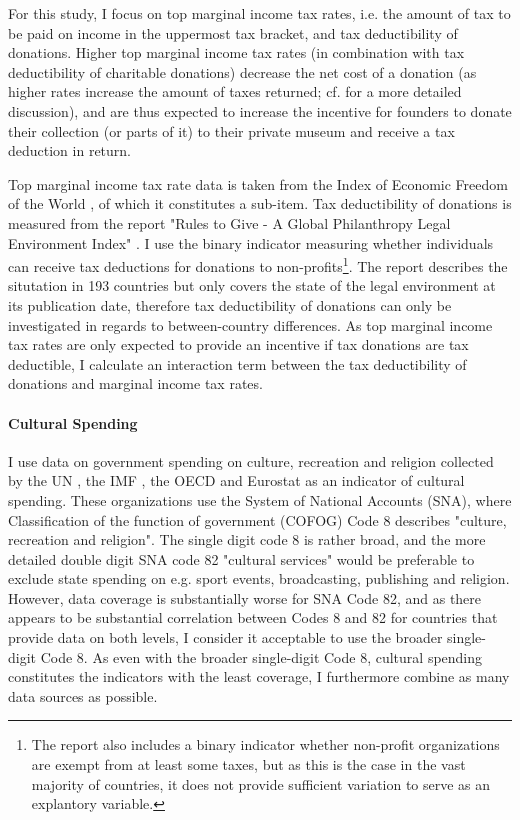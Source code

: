 \documentclass[11pt]{article}
\begin{document}
For this study, I focus on top marginal income tax rates, i.e. the amount of tax to be paid on income in the uppermost tax bracket, and tax deductibility of donations.
Higher top marginal income tax rates (in combination with tax deductibility of charitable donations) decrease the net cost of a donation (as higher rates increase the amount of taxes returned; cf. \cite{Hemels_2017_incentives} for a more detailed discussion), and are thus expected to increase the incentive for founders to donate their collection (or parts of it) to their private museum and receive a tax deduction in return. 


Top marginal income tax rate data is taken from the Index of Economic Freedom of the World \parencite{Fraser_2022_economic_freedom}, of which it constitutes a sub-item.
Tax deductibility of donations is measured from the report "Rules to Give - A Global Philanthropy Legal Environment Index" \parencite{Quick_Kruse_Pickering_2014_philanthropy}.
I use the binary indicator measuring whether individuals can receive tax deductions for donations to non-profits\footnote{The report also includes a binary indicator whether non-profit organizations are exempt from at least some taxes, but as this is the case in the vast majority of countries, it does not provide sufficient variation to serve as an explantory variable.}.
The report describes the situtation in 193 countries but only covers the state of the legal environment at its publication date, therefore tax deductibility of donations can only be investigated in regards to between-country differences.
As top marginal income tax rates are only expected to provide an incentive if tax donations are tax deductible, I calculate an interaction term between the tax deductibility of donations and marginal income tax rates. 

\paragraph*{Cultural Spending}


I use data on government spending on culture, recreation and religion collected by the UN \parencite{UN_2022_consumption}, the IMF \parencite{IMF_2022_GFS}, the OECD \parencite{OECD_2022_SNA_TABLE11_ARCHIVE,OECD_2022_SNA_TABLE11} and Eurostat \parencite{Eurostat_2022_COFOG} as an indicator of cultural spending.
These organizations use the System of National Accounts (SNA), where Classification of the function of government (COFOG) Code 8 describes "culture, recreation and religion".
The single digit code 8 is rather broad, and the more detailed  double digit SNA code 82 "cultural services" would be preferable to exclude state spending on e.g. sport events, broadcasting, publishing and religion. 
However, data coverage is substantially worse for SNA Code 82, and as there appears to be substantial correlation between Codes 8 and 82 for countries that provide data on both levels, I consider it acceptable to use the broader single-digit Code 8.
As even with the broader single-digit Code 8, cultural spending constitutes the indicators with the least coverage, I furthermore combine as many data sources as possible.
\end{document}
